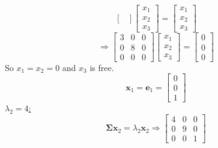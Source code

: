 \begin{enumerate}[label=(\alph*)]
\[\begin{bmatrix}
                \end{bmatrix}
                \begin{bmatrix}
                    x_1 \\
                    x_2 \\
                    x_3
                \end{bmatrix}
                =
                \begin{bmatrix}
                    x_1 \\
                    x_2 \\
                    x_3
                \end{bmatrix}
            \]
            \[
                \Rightarrow
                \begin{bmatrix}
                    3 & 0 & 0\\
                    0 & 8 & 0\\
                    0 & 0 & 0
                \end{bmatrix}
                \begin{bmatrix}
                    x_1 \\
                    x_2 \\
                    x_3
                \end{bmatrix}
                =
                \begin{bmatrix}
                    0 \\
                    0 \\
                    0
                \end{bmatrix}
            \]
            So $x_1 = x_2 = 0$ and $x_3$ is free.
            \[
                \mathbf{x}_1
                =
                \mathbf{e}_1
                =
                \begin{bmatrix}
                    0 \\
                    0 \\
                    1
                \end{bmatrix}
            \]
            \underline{$\lambda_2 = 4$:}
            \[
                \mathbf{\Sigma}\mathbf{x}_2 = \lambda_2\mathbf{x}_2
                \Rightarrow
                \begin{bmatrix}
                    4 & 0 & 0\\
                    0 & 9 & 0\\
                    0 & 0 & 1
                \end{bmatrix}
\]
\end{enumerate}

